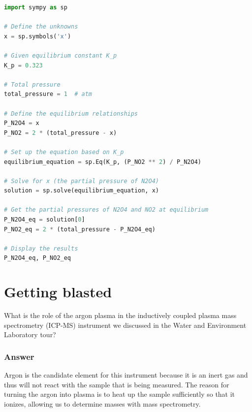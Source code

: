 \documentclass[12pt]{article}
\begin{document}
\begin{lstlisting}[language=Python]
import sympy as sp

# Define the unknowns
x = sp.symbols('x')

# Given equilibrium constant K_p
K_p = 0.323

# Total pressure
total_pressure = 1  # atm

# Define the equilibrium relationships
P_N2O4 = x
P_NO2 = 2 * (total_pressure - x)

# Set up the equation based on K_p
equilibrium_equation = sp.Eq(K_p, (P_NO2 ** 2) / P_N2O4)

# Solve for x (the partial pressure of N2O4)
solution = sp.solve(equilibrium_equation, x)

# Get the partial pressures of N2O4 and NO2 at equilibrium
P_N2O4_eq = solution[0]
P_NO2_eq = 2 * (total_pressure - P_N2O4_eq)

# Display the results
P_N2O4_eq, P_NO2_eq

\end{lstlisting}


\section{Getting blasted}
What is the role of the argon plasma in the inductively coupled plasma mass spectrometry (ICP-MS) instrument we discussed in the Water and Environment Laboratory tour?
\subsubsection{Answer}
Argon is the candidate element for this instrument because it is an inert gas and thus will not react with the sample that is being measured. The reason for turning the argon into plasma is to heat up the sample sufficiently so that it ionizes, allowing us to determine masses with mass spectrometry.
\end{document}
